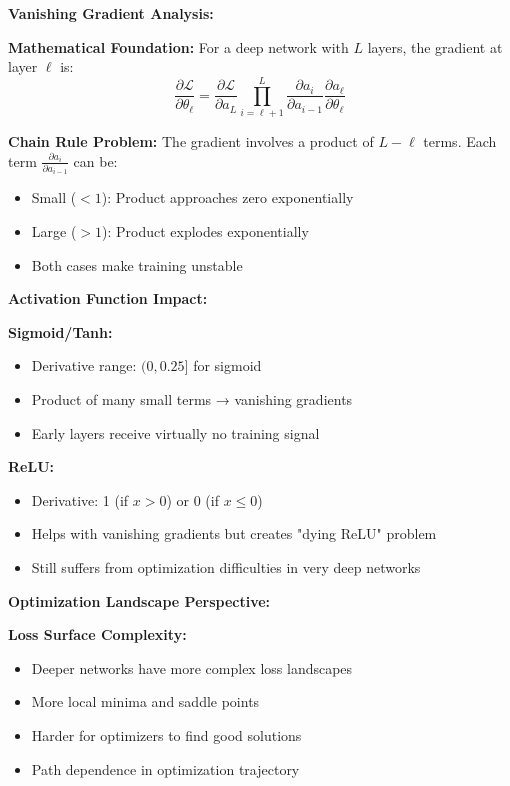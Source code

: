 \documentclass[12pt]{article}
\begin{document}
\begin{enumerate}[(a)]
{    \textbf{Vanishing Gradient Analysis:}
    
    \textbf{Mathematical Foundation:}
    For a deep network with $L$ layers, the gradient at layer $\ell$ is:
    $$\frac{\partial \mathcal{L}}{\partial \theta_\ell} = \frac{\partial \mathcal{L}}{\partial a_L} \prod_{i=\ell+1}^L \frac{\partial a_i}{\partial a_{i-1}} \frac{\partial a_\ell}{\partial \theta_\ell}$$
    
    \textbf{Chain Rule Problem:}
    The gradient involves a product of $L-\ell$ terms. Each term $\frac{\partial a_i}{\partial a_{i-1}}$ can be:
    \begin{itemize}
        \item Small ($< 1$): Product approaches zero exponentially
        \item Large ($> 1$): Product explodes exponentially
        \item Both cases make training unstable
    \end{itemize}
    
    \textbf{Activation Function Impact:}
    
    \textbf{Sigmoid/Tanh:}
    \begin{itemize}
        \item Derivative range: $(0, 0.25]$ for sigmoid
        \item Product of many small terms → vanishing gradients
        \item Early layers receive virtually no training signal
    \end{itemize}
    
    \textbf{ReLU:}
    \begin{itemize}
        \item Derivative: 1 (if $x > 0$) or 0 (if $x \leq 0$)
        \item Helps with vanishing gradients but creates "dying ReLU" problem
        \item Still suffers from optimization difficulties in very deep networks
    \end{itemize}
    
    \textbf{Optimization Landscape Perspective:}
    
    \textbf{Loss Surface Complexity:}
    \begin{itemize}
        \item Deeper networks have more complex loss landscapes
        \item More local minima and saddle points
        \item Harder for optimizers to find good solutions
        \item Path dependence in optimization trajectory
    \end{itemize}
    
}
\end{enumerate}
\end{document}
